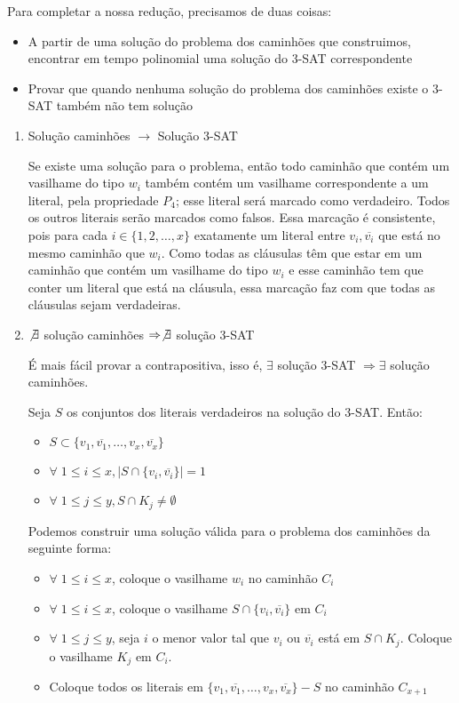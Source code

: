 \documentclass[11pt]{article}
\begin{document}
Para completar a nossa redução, precisamos de duas coisas:
\begin{itemize}
\item A partir de uma solução do problema dos caminhões que construimos,
encontrar em tempo polinomial uma solução do 3-SAT correspondente
\item Provar que quando nenhuma solução do problema dos caminhões existe o
3-SAT também não tem solução
\end{itemize}

\begin{enumerate}
\item Solução caminhões $\to$ Solução 3-SAT
\label{sec-3-2-2-1}

Se existe uma solução para o problema, então todo caminhão que contém
um vasilhame do tipo $w_i$ também contém um vasilhame correspondente a
um literal, pela propriedade $P_4$; esse literal será marcado como
verdadeiro. Todos os outros literais serão marcados como falsos. Essa
marcação é consistente, pois para cada $i \in \{1, 2, \ldots, x\}$
exatamente um literal entre $v_i, \overline{v_i}$ que está no mesmo
caminhão que $w_i$. Como todas as cláusulas têm que estar em um
caminhão que contém um vasilhame do tipo $w_i$ e esse caminhão tem que
conter um literal que está na cláusula, essa marcação faz com que
todas as cláusulas sejam verdadeiras.


\item $\not \exists$ solução caminhões $\Rightarrow \not \exists$ solução 3-SAT
\label{sec-3-2-2-2}

É mais fácil provar a contrapositiva, isso é, $\exists$ solução 3-SAT
$\Rightarrow \exists$ solução caminhões.

Seja $S$ os conjuntos dos literais verdadeiros na solução do 3-SAT.
Então:
\begin{itemize}
\item $S \subset \{v_1,\overline{v_1}, \ldots, v_x, \overline{v_x}\}$
\item $\forall \; 1\leq i \leq x, |S\cap\{v_i, \overline{v_i}\}| = 1$
\item $\forall \; 1\leq j \leq y, S\cap K_j \neq \emptyset$
\end{itemize}

Podemos construir uma solução válida para o problema dos caminhões da
seguinte forma:
\begin{itemize}
\item $\forall \; 1\leq i \leq x$, coloque o vasilhame $w_i$ no caminhão $C_i$
\item $\forall \; 1\leq i \leq x$, coloque o vasilhame $S\cap\{v_i, \overline{v_i}\}$ em $C_i$
\item $\forall \; 1\leq j \leq y$, seja $i$ o menor valor tal que $v_i$ ou
$\overline{v_i}$ está em $S\cap K_j$. Coloque o vasilhame $K_j$ em $C_i$.
\item Coloque todos os literais em $\{v_1,\overline{v_1}, \ldots, v_x,
  \overline{v_x}\} - S$ no caminhão $C_{x+1}$
\end{itemize}



\end{enumerate}
\end{document}
